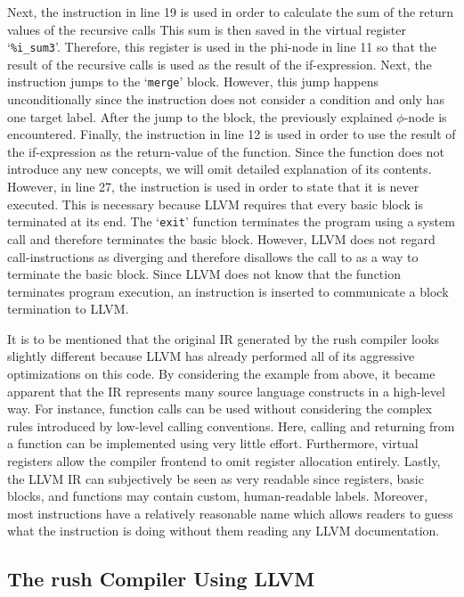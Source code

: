 Next, the  instruction in line 19 is used in order to calculate the sum of the return values of the recursive calls
This sum is then saved in the virtual register `\texttt{\%i\_sum3}'.
Therefore, this register is used in the phi-node in line 11 so that the result of the recursive calls is used as the result of the if-expression.
Next, the  instruction jumps to the `\texttt{merge}' block.
However, this jump happens unconditionally since the instruction does not consider a condition and only has one target label.
After the jump to the  block, the previously explained $\phi$-node is encountered.
Finally, the  instruction in line 12 is used in order to use the result of the if-expression as the return-value of the function.
Since the  function does not introduce any new concepts, we will omit detailed explanation of its contents.
However, in line 27, the  instruction is used in order to state that it is never executed.
This is necessary because LLVM requires that every basic block is terminated at its end.
The `\texttt{exit}' function terminates the program using a system call and therefore terminates the basic block.
However, LLVM does not regard call-instructions as diverging and therefore disallows the call to  as a way to terminate the basic block.
Since LLVM does not know that the  function terminates program execution, an  instruction is inserted to communicate a block termination to LLVM\@.

It is to be mentioned that the original IR generated by the rush compiler looks slightly different because LLVM has already performed all of its aggressive optimizations on this code.
By considering the example from above, it became apparent that the IR represents many source language constructs in a high-level way.
For instance, function calls can be used without considering the complex rules introduced by low-level calling conventions.
Here, calling and returning from a function can be implemented using very little effort.
Furthermore, virtual registers allow the compiler frontend to omit register allocation entirely.
Lastly, the LLVM IR can subjectively be seen as very readable since registers, basic blocks, and functions may contain custom, human-readable labels.
Moreover, most instructions have a relatively reasonable name which allows readers to guess what the instruction is doing without them reading any LLVM documentation.

\subsection{The rush Compiler Using LLVM}

